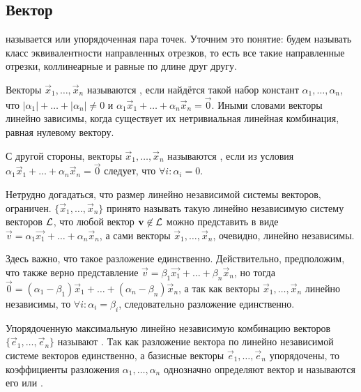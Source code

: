 \subsection{Вектор}
 называется  или упорядоченная пара точек. Уточним это понятие:  будем называть класс эквивалентности направленных отрезков, то есть все такие направленные отрезки, коллинеарные и равные по длине друг другу.

    Векторы $\vec{x}_1, \ldots, \vec{x}_n$ называются , если найдётся такой набор констант $\alpha_1, \ldots, \alpha_n$, что $|\alpha_1| + \ldots + |\alpha_n| \not= 0$ и $\alpha_1 \vec{x}_1 + \ldots + \alpha_n \vec{x}_n = \vec{0}$. Иными словами векторы линейно зависимы, когда существует их нетривиальная линейная комбинация, равная нулевому вектору.

    С другой стороны, векторы $\vec{x}_1, \ldots, \vec{x}_n$ называются , если из условия $\alpha_1 \vec{x}_1 + \ldots + \alpha_n \vec{x}_n = \vec{0}$ следует, что $\forall i : \alpha_i = 0$.

    Нетрудно догадаться, что размер линейно независимой системы векторов, ограничен.  $\{\vec{x}_1, \ldots, \vec{x}_n\}$ принято называть такую линейно независимую систему векторов $\mathcal{L}$, что любой вектор $\mathbf{v} \not\in \mathcal{L}$ можно представить в виде $\vec{v} = \alpha_1 \vec{x_1} + \ldots + \alpha_n \vec{x}_n$, а сами векторы $\vec{x}_1, \ldots, \vec{x}_n$, очевидно, линейно независимы.

    Здесь важно, что такое разложение единственно. Действительно, предположим, что также верно представление $\vec{v} = \beta_1 \vec{x_1} + \ldots + \beta_n \vec{x}_n$, но тогда $\vec{0} = (\alpha_1 - \beta_1) \vec{x}_1 + \ldots + (\alpha_n - \beta_n) \vec{x}_n$, а так как векторы $\vec{x}_1, \ldots, \vec{x}_n$ линейно независимы, то $\forall i: \alpha_i = \beta_i$, следовательно разложение единственно.

    Упорядоченную максимальную линейно независимую комбинацию векторов $\{\vec{e}_1, \ldots, \vec{e}_n \}$ называют . Так как разложение вектора по линейно независимой системе векторов единственно, а базисные векторы $\vec{e}_1, \ldots, \vec{e}_n$ упорядочены, то коэффициенты разложения $\alpha_1, \ldots, \alpha_n$ однозначно определяют вектор и называются его  или .


